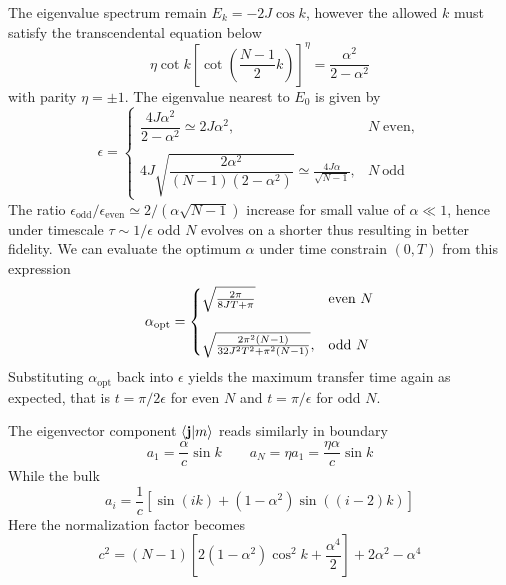 \documentclass[../../../main.tex]{subfiles}
\begin{document}
The eigenvalue spectrum remain $E_k = -2J \cos k$, however the allowed $k $ must satisfy the transcendental equation below
\begin{equation*}
  \eta\cot k \left[ \cot\left(\frac{N-1}{2}k\right) \right]^\eta  = \frac{\alpha^2}{2-\alpha^2}
\end{equation*}
with parity $\eta=\pm1$.
The eigenvalue nearest to $E_0$ is given by
\begin{equation*}
  \epsilon = \begin{cases} \dfrac{4J\alpha^2}{2-\alpha^2}\simeq2J\alpha^2,                                            & N\; \mathrm{even}, \\\\
              4J\sqrt{\dfrac{2\alpha^2}{(N-1)(2-\alpha^2)}}\simeq \frac{4J\alpha }{\sqrt{N-1}}, & N\ \mathrm{odd}
  \end{cases}
\end{equation*}
The ratio $\epsilon_\text{odd}/\epsilon_\text{even}\simeq 2 /(\alpha \sqrt{N-1})$ increase for small value of $\alpha \ll1$, hence under timescale $\tau\sim1/\epsilon$ odd $N$ evolves on a shorter thus resulting in better fidelity.
We can evaluate the optimum $\alpha$ under time constrain $(0,T)$ from this expression
\begin{equation*}
  \alpha_{\rm opt}=
  \begin{cases}
    \sqrt{\frac{2\pi}{8JT+\pi}}                        & \text{even }N \\\\
    \sqrt{ \frac{2\pi^2(N-1)} {32J^2T^2+\pi^2(N-1)} }, & \text{odd }N
  \end{cases}
\end{equation*}
Substituting $\alpha_\text{opt}$ back into $\epsilon$ yields the maximum transfer time again as expected, that is $t = \pi/2\epsilon$ for even $N$ and $t=\pi/\epsilon$ for odd $N$.

The eigenvector component $\braket{\mathbf{j} |m }$ reads similarly in boundary
\begin{equation*}
  a_1=\frac{\alpha}{c}\sin k \qquad
  a_N=\eta a_1 =\frac{\eta\alpha}{c}\sin k
\end{equation*}
While the bulk
\begin{equation*}
  a_i= \frac{1}{c} \left[ \sin(ik) + (1-\alpha^2)\sin((i-2)k) \right]
\end{equation*}
Here the normalization factor becomes
\begin{equation*}
  c^2 = (N-1) \left[ 2(1-\alpha^2)\cos^2k+\frac{\alpha^4}{2} \right] +2\alpha^2-\alpha^4
\end{equation*}
\end{document}
